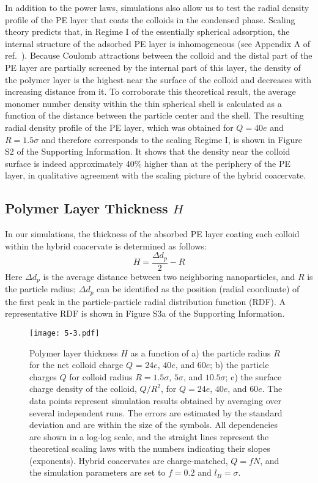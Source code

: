 \documentclass[journal=mamobx, manuscript=article]{achemso}
\begin{document}
In addition to the power laws, simulations also allow us to test the radial density profile of the PE layer that coats the colloids in the condensed phase. Scaling theory predicts that, in Regime I of the essentially spherical adsorption, the internal structure of the adsorbed PE layer is inhomogeneous (see Appendix A of ref.~). Because Coulomb attractions between the colloid and the distal part of the PE layer are partially screened by the internal part of this layer, the density of the polymer layer is the highest near the surface of the colloid and decreases with increasing distance from it. To corroborate this theoretical result, the average monomer number density within the thin spherical shell is calculated as a function of the distance between the particle center and the shell. The resulting radial density profile of the PE layer, which was obtained for $Q = 40e$ and $R = 1.5\sigma$ and therefore corresponds to the scaling Regime I, is shown in Figure S2 of the Supporting Information. It shows that the density near the colloid surface is indeed approximately 40\% higher than at the periphery of the PE layer, in qualitative agreement with the scaling picture of the hybrid coacervate.~\cite{artem2022hybrid}




\subsection{Polymer Layer Thickness $H$}

In our simulations, the thickness of the absorbed PE layer coating each colloid within the hybrid coacervate is determined as follows:
\begin{equation}
H = \frac{ \Delta d_{p} }{2} - R
\end{equation}
Here $\Delta d_{p}$ is the average distance between two neighboring nanoparticles, and $R$ is the particle radius; $\Delta d_{p}$ can be identified as the position (radial coordinate) of the first peak in the particle-particle radial distribution function (RDF). A representative RDF is shown in Figure S3a of the Supporting Information. 

\begin{figure}[ht]
\centering
\texttt{[image: 5-3.pdf]}
\caption{Polymer layer thickness $H$ as a function of
a) the particle radius $R$ for the net colloid charge $Q$ = $24e$, $40e$, and $60e$; 
b) the particle charges $Q$ for colloid radius $R = 1.5 \sigma$, $5\sigma$, and $10.5\sigma$;
c) the surface charge density of the colloid, $Q / R^2$, for $Q = 24e$, $40e$, and $60e$.
The data points represent simulation results obtained by averaging over several independent runs. The errors are estimated by the standard deviation and are within the size of the symbols. All dependencies are shown in a log-log scale, and the straight lines represent the theoretical scaling laws with the numbers indicating their slopes (exponents). Hybrid coacervates are charge-matched, $Q = f N$, and the simulation parameters are set to $f = 0.2$ and $l_{B} = \sigma$.}
\label{fig:thickness}
\end{figure}
\end{document}

